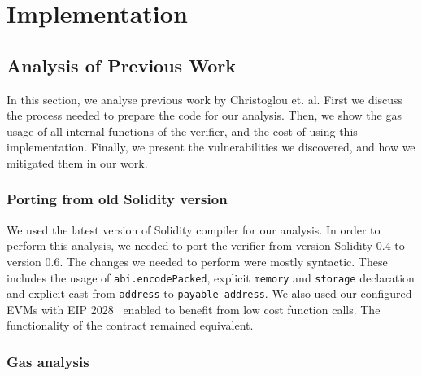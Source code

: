 \chapter{Implementation}



\section{Analysis of Previous Work}

In this section, we analyse previous work by Christoglou et. al. First we
discuss the process needed to prepare the code for our analysis. Then, we show
the gas usage of all internal functions of the verifier, and the cost of using
this implementation. Finally, we present the vulnerabilities we discovered, and
how we mitigated them in our work.

\subsection{Porting from old Solidity version}

We used the latest version of Solidity compiler for our analysis. In order to
perform this analysis, we needed to port the verifier from version Solidity 0.4
to version 0.6. The changes we needed to perform were mostly syntactic. These
includes the usage of \texttt{abi.encodePacked}, explicit \texttt{memory} and
\texttt{storage} declaration and explicit cast from \texttt{address} to
\texttt{payable address}. We also used our configured EVMs with EIP
2028~\cite{EIP2028} enabled to benefit from low cost function calls. The
functionality of the contract remained equivalent.


\subsection{Gas analysis}

